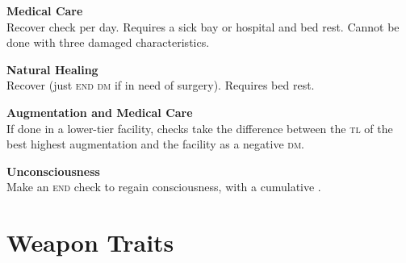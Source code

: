 \documentclass{cheatsheet}
\begin{document}
\begin{multicols}{2}
\textbf{Medical Care}\\
Recover  check per day.  Requires a
sick bay or hospital and bed rest.  Cannot be done with three damaged
characteristics.

\textbf{Natural Healing}\\
Recover  (just \textsc{end dm} if in need of
surgery).  Requires bed rest.

\textbf{Augmentation and Medical Care}\\
If done in a lower-tier facility, checks take the difference between
the \textsc{tl} of the best highest augmentation and the facility as a
negative \textsc{dm}.

\textbf{Unconsciousness}\\
Make an \textsc{end} check to regain consciousness, with a cumulative
.
\end{multicols}

\section{Weapon Traits}
\end{document}
